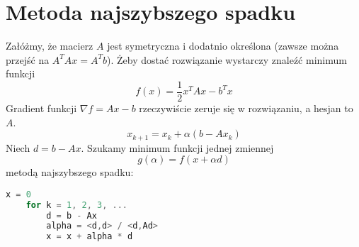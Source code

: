 \section{Metoda najszybszego spadku}
Załóżmy, że macierz \( A \) jest symetryczna i dodatnio określona (zawsze można przejść na \( A^TAx = A^Tb \)). Żeby dostać rozwiązanie wystarczy znaleźć minimum funkcji
\[ 
    f(x) = \frac{1}{2}x^TAx - b^Tx
\]
Gradient funkcji \( \nabla f = Ax - b \) rzeczywiście zeruje się w rozwiązaniu, a hesjan to \( A \).
\[
    x_{k+1} = x_k + \alpha(b - Ax_k)
\]
Niech \( d = b - Ax \). Szukamy minimum funkcji jednej zmiennej
\[
    g(\alpha) = f(x + \alpha d)
\]
metodą najszybszego spadku:
\begin{lstlisting}[language=Cpp]
    x = 0
    for k = 1, 2, 3, ...
        d = b - Ax
        alpha = <d,d> / <d,Ad>
        x = x + alpha * d
\end{lstlisting}